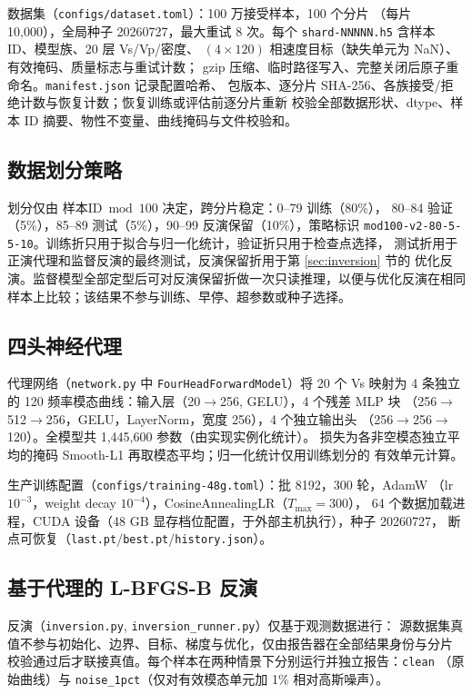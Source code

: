 \documentclass[UTF8,a4paper,11pt]{ctexart}
\begin{document}
数据集（\texttt{configs/dataset.toml}）：100 万接受样本，100 个分片
（每片 10{,}000），全局种子 20260727，最大重试 8 次。每个
\texttt{shard-NNNNN.h5} 含样本 ID、模型族、20 层 Vs/Vp/密度、
\((4\times120)\) 相速度目标（缺失单元为 NaN）、有效掩码、质量标志与重试计数；
gzip 压缩、临时路径写入、完整关闭后原子重命名。\texttt{manifest.json} 记录配置哈希、
包版本、逐分片 SHA-256、各族接受/拒绝计数与恢复计数；恢复训练或评估前逐分片重新
校验全部数据形状、dtype、样本 ID 摘要、物性不变量、曲线掩码与文件校验和。

\subsection{数据划分策略}
划分仅由 \(\text{样本ID} \bmod 100\) 决定，跨分片稳定：0--79 训练（80\%），
80--84 验证（5\%），85--89 测试（5\%），90--99 反演保留（10\%），策略标识
\texttt{mod100-v2-80-5-5-10}。训练折只用于拟合与归一化统计，验证折只用于检查点选择，
测试折用于正演代理和监督反演的最终测试，反演保留折用于第 \ref{sec:inversion} 节的
优化反演。监督模型全部定型后可对反演保留折做一次只读推理，以便与优化反演在相同
样本上比较；该结果不参与训练、早停、超参数或种子选择。

\subsection{四头神经代理}\label{sec:net}
代理网络（\texttt{network.py} 中 \texttt{FourHeadForwardModel}）将 20 个 Vs 映射为
4 条独立的 120 频率模态曲线：输入层（20\(\to\)256, GELU），4 个残差 MLP 块
（256\(\to\)512\(\to\)256，GELU，LayerNorm，宽度 256），4 个独立输出头
（256\(\to\)256\(\to\)120）。全模型共 1{,}445{,}600 参数（由实现实例化统计）。
损失为各非空模态独立平均的掩码 Smooth-L1 再取模态平均；归一化统计仅用训练划分的
有效单元计算。

生产训练配置（\texttt{configs/training-48g.toml}）：批 8192，300 轮，AdamW
（lr \(10^{-3}\)，weight decay \(10^{-4}\)），CosineAnnealingLR（\(T_{\max}=300\)），
64 个数据加载进程，CUDA 设备（48 GB 显存档位配置，于外部主机执行），种子 20260727，
断点可恢复（\texttt{last.pt}/\texttt{best.pt}/\texttt{history.json}）。

\subsection{基于代理的 L-BFGS-B 反演}\label{sec:inv-method}
反演（\texttt{inversion.py}, \texttt{inversion\_runner.py}）仅基于观测数据进行：
源数据集真值不参与初始化、边界、目标、梯度与优化，仅由报告器在全部结果身份与分片
校验通过后才联接真值。每个样本在两种情景下分别运行并独立报告：\texttt{clean}
（原始曲线）与 \texttt{noise\_1pct}（仅对有效模态单元加 1\% 相对高斯噪声）。
\end{document}

